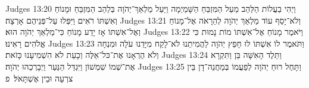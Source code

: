 Judges 13:20	וַיְהִי בַעֲלוֹת הַלַּהַב מֵעַל הַמִּזְבֵּחַ הַשָּׁמַיְמָה וַיַּעַל מַלְאַךְ־יְהֹוָה בְּלַהַב הַמִּזְבֵּחַ וּמָנוֹחַ וְאִשְׁתּוֹ רֹאִים וַיִּפְּלוּ עַל־פְּנֵיהֶם אָרְצָה׃
Judges 13:21	וְלֹא־יָסַף עוֹד מַלְאַךְ יְהֹוָה לְהֵרָאֹה אֶל־מָנוֹחַ וְאֶל־אִשְׁתּוֹ אָז יָדַע מָנוֹחַ כִּי־מַלְאַךְ יְהֹוָה הוּא׃
Judges 13:22	וַיֹּאמֶר מָנוֹחַ אֶל־אִשְׁתּוֹ מוֹת נָמוּת כִּי אֱלֹהִים רָאִינוּ׃
Judges 13:23	וַתֹּאמֶר לוֹ אִשְׁתּוֹ לוּ חָפֵץ יְהֹוָה לַהֲמִיתֵנוּ לֹא־לָקַח מִיָּדֵנוּ עֹלָה וּמִנְחָה וְלֹא הֶרְאָנוּ אֶת־כּל־אֵלֶּה וְכָעֵת לֹא הִשְׁמִיעָנוּ כָּזֹאת׃
Judges 13:24	וַתֵּלֶד הָאִשָּׁה בֵּן וַתִּקְרָא אֶת־שְׁמוֹ שִׁמְשׁוֹן וַיִּגְדַּל הַנַּעַר וַיְבָרְכֵהוּ יְהֹוָה׃
Judges 13:25	וַתָּחֶל רוּחַ יְהֹוָה לְפַעֲמוֹ בְּמַחֲנֵה־דָן בֵּין צרְעָה וּבֵין אֶשְׁתָּאֹל׃ {פ}
